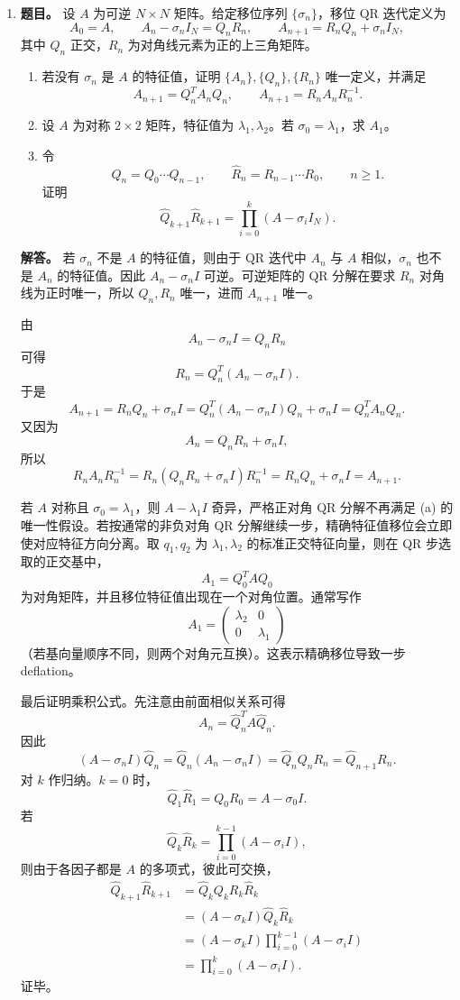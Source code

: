 ﻿\documentclass[UTF8,12pt]{ctexart}
\begin{document}
\begin{enumerate}[label=\textbf{\arabic*.},leftmargin=2.2em]
\item \textbf{题目。} 设 \(A\) 为可逆 \(N\times N\) 矩阵。给定移位序列 \(\{\sigma_n\}\)，移位 QR 迭代定义为
\[
A_0=A,\qquad A_n-\sigma_nI_N=Q_nR_n,\qquad
A_{n+1}=R_nQ_n+\sigma_nI_N,
\]
其中 \(Q_n\) 正交，\(R_n\) 为对角线元素为正的上三角矩阵。
\begin{enumerate}[label=(\alph*),leftmargin=2.0em]
\item 若没有 \(\sigma_n\) 是 \(A\) 的特征值，证明 \(\{A_n\},\{Q_n\},\{R_n\}\) 唯一定义，并满足
\[
A_{n+1}=Q_n^TA_nQ_n,\qquad
A_{n+1}=R_nA_nR_n^{-1}.
\]
\item 设 \(A\) 为对称 \(2\times2\) 矩阵，特征值为 \(\lambda_1,\lambda_2\)。若 \(\sigma_0=\lambda_1\)，求 \(A_1\)。
\item 令
\[
\widehat Q_n=Q_0\cdots Q_{n-1},\qquad
\widehat R_n=R_{n-1}\cdots R_0,\qquad n\ge1.
\]
证明
\[
\widehat Q_{k+1}\widehat R_{k+1}
=\prod_{i=0}^{k}(A-\sigma_iI_N).
\]
\end{enumerate}

\textbf{解答。} 若 \(\sigma_n\) 不是 \(A\) 的特征值，则由于 QR 迭代中 \(A_n\) 与 \(A\) 相似，\(\sigma_n\) 也不是 \(A_n\) 的特征值。因此 \(A_n-\sigma_nI\) 可逆。可逆矩阵的 QR 分解在要求 \(R_n\) 对角线为正时唯一，所以 \(Q_n,R_n\) 唯一，进而 \(A_{n+1}\) 唯一。

由
\[
A_n-\sigma_nI=Q_nR_n
\]
可得
\[
R_n=Q_n^T(A_n-\sigma_nI).
\]
于是
\[
A_{n+1}
=R_nQ_n+\sigma_nI
=Q_n^T(A_n-\sigma_nI)Q_n+\sigma_nI
=Q_n^TA_nQ_n.
\]
又因为
\[
A_n=Q_nR_n+\sigma_nI,
\]
所以
\[
R_nA_nR_n^{-1}
=R_n(Q_nR_n+\sigma_nI)R_n^{-1}
=R_nQ_n+\sigma_nI
=A_{n+1}.
\]

若 \(A\) 对称且 \(\sigma_0=\lambda_1\)，则 \(A-\lambda_1I\) 奇异，严格正对角 QR 分解不再满足 (a) 的唯一性假设。若按通常的非负对角 QR 分解继续一步，精确特征值移位会立即使对应特征方向分离。取 \(q_1,q_2\) 为 \(\lambda_1,\lambda_2\) 的标准正交特征向量，则在 QR 步选取的正交基中，
\[
A_1=Q_0^TAQ_0
\]
为对角矩阵，并且移位特征值出现在一个对角位置。通常写作
\[
\boxed{
A_1=\begin{pmatrix}
\lambda_2&0\\
0&\lambda_1
\end{pmatrix}}
\]
（若基向量顺序不同，则两个对角元互换）。这表示精确移位导致一步 deflation。

最后证明乘积公式。先注意由前面相似关系可得
\[
A_n=\widehat Q_n^TA\widehat Q_n.
\]
因此
\[
(A-\sigma_nI)\widehat Q_n
=\widehat Q_n(A_n-\sigma_nI)
=\widehat Q_nQ_nR_n
=\widehat Q_{n+1}R_n.
\]
对 \(k\) 作归纳。\(k=0\) 时，
\[
\widehat Q_1\widehat R_1=Q_0R_0=A-\sigma_0I.
\]
若
\[
\widehat Q_k\widehat R_k=\prod_{i=0}^{k-1}(A-\sigma_iI),
\]
则由于各因子都是 \(A\) 的多项式，彼此可交换，
\[
\begin{aligned}
\widehat Q_{k+1}\widehat R_{k+1}
&=\widehat Q_kQ_kR_k\widehat R_k\\
&=(A-\sigma_kI)\widehat Q_k\widehat R_k\\
&=(A-\sigma_kI)\prod_{i=0}^{k-1}(A-\sigma_iI)\\
&=\prod_{i=0}^{k}(A-\sigma_iI).
\end{aligned}
\]
证毕。


\end{enumerate}
\end{document}
